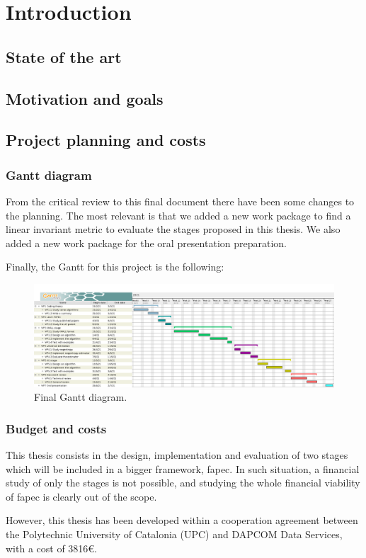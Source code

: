 \chapter{Introduction}
\section{State of the art}

\section{Motivation and goals}

\section{Project planning and costs}
\subsection{Gantt diagram}
From the critical review to this final document there have been some changes to the planning. The most relevant is that we added a new work package to find a linear invariant metric to evaluate the stages proposed in this thesis. We also added a new work package for the oral presentation preparation.

Finally, the Gantt for this project is the following:
\begin{figure}[h!]
	\begin{center}
		\includegraphics[scale=0.255]{images/gantt.png}
	\end{center}
	\caption{Final Gantt diagram.}
	\label{fig:gantt}
\end{figure}

\subsection{Budget and costs}
This thesis consists in the design, implementation and evaluation of two stages which will be included in a bigger framework, \acrshort{fapec}. In such situation, a financial study of only the stages is not possible, and studying the whole financial viability of \acrshort{fapec} is clearly out of the scope.

However, this thesis has been developed within a cooperation agreement between the Polytechnic University of Catalonia (UPC) and DAPCOM Data Services, with a cost of 3816€.

